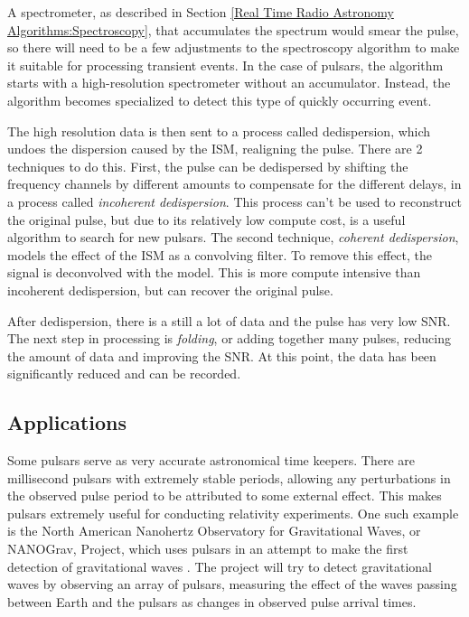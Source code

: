 A spectrometer, as described in Section \ref{Real Time Radio Astronomy Algorithms:Spectroscopy}, that accumulates the spectrum would smear the pulse, so there will need to be a few adjustments to the spectroscopy algorithm to make it suitable for processing transient events. 
In the case of pulsars, the algorithm starts with a high-resolution spectrometer without an accumulator. 
Instead, the algorithm becomes specialized to detect this type of quickly occurring event.

The high resolution data is then sent to a process called dedispersion, which undoes the dispersion caused by the ISM, realigning the pulse.
There are 2 techniques to do this.
First, the pulse can be dedispersed by shifting the frequency channels by different amounts to compensate for the different delays, in a process called \emph{incoherent dedispersion}. %
This process can't be used to reconstruct the original pulse, but due to its relatively low compute cost, is a useful algorithm to search for new pulsars.
The second technique, \emph{coherent dedispersion}, models the effect of the ISM as a convolving filter. 
To remove this effect, the signal is deconvolved with the model.
This is more compute intensive than incoherent dedispersion, but can recover the original pulse.

After dedispersion, there is a still a lot of data and the pulse has very low SNR. 
The next step in processing is \emph{folding}, or adding together many pulses, reducing the amount of data and improving the SNR.
At this point, the data has been significantly reduced and can be recorded. 



%
\subsection{Applications}
Some pulsars serve as very accurate astronomical time keepers.
There are millisecond pulsars with extremely stable periods, allowing any perturbations in the observed pulse period to be attributed to some external effect.
This makes pulsars extremely useful for conducting relativity experiments. 
One such example is the North American Nanohertz Observatory for Gravitational Waves, or NANOGrav, Project, %
which uses pulsars in an attempt to make the first detection of gravitational waves \cite{2009astro2010S..64D}. 
The project will try to detect gravitational waves by observing an array of pulsars, measuring the effect of the waves passing between Earth and the pulsars as changes in observed pulse arrival times.

